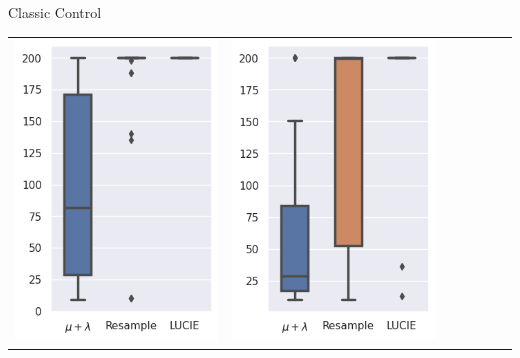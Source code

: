 \begin{frame}{\tcv{} Classic Control}
\begin{table}
\begin{tabular}{ccccccc}
                \includegraphics[width=\figwidth]{images/LUCIE/cartpole/boxplot_cartpole_400.png} &
                \includegraphics[width=\figwidth]{images/LUCIE/cartpole/boxplot_cartpole_600.png} &

\end{tabular}
\end{table}
\end{frame}
